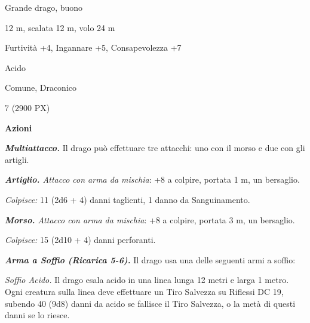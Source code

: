 \begin{multicols}{2}
{%

\begin{description}[noitemsep, topsep=0pt, parsep=0pt, partopsep=0pt, itemsep=1pt, leftmargin=2.35cm,  labelwidth=2.2cm, itemindent=0cm, listparindent=0pt] %
\setlength{\baselineskip}{10pt}
\item[\textbf{Taglia/Tipo}] Grande drago, buono
\item[\textbf{Caratt.}] 
\item[\textbf{Punti Ferita}] 
\item[\textbf{Movimento}] 12 m, scalata 12 m, volo 24 m
\item[\textbf{Tiri Salvez.}] 
\item[\textbf{Comp.}] Furtività +4, Ingannare +5, Consapevolezza +7
\item[\textbf{Imm. Danni}] Acido
\item[\textbf{Sensi}] 
\item[\textbf{Linguaggi}] Comune, Draconico
\item[\textbf{Sfida}] 7 (2900 PX)
\end{description}
\smallskip

\textbf{Azioni}

\emph{\textbf{Multiattacco.}} Il drago può effettuare tre attacchi: uno con il morso e due con gli artigli.

\emph{\textbf{Artiglio.} Attacco con arma da mischia}: +8 a colpire, portata 1 m, un bersaglio.

\emph{Colpisce:} 11 (2d6 + 4) danni taglienti, 1 danno da Sanguinamento.

\emph{\textbf{Morso.} Attacco con arma da mischia}: +8 a colpire, portata 3 m, un bersaglio.

\emph{Colpisce:} 15 (2d10 + 4) danni perforanti.

\emph{\textbf{Arma a Soffio (Ricarica 5-6).}} Il drago usa una delle seguenti armi a soffio:

\emph{Soffio Acido.} Il drago esala acido in una linea lunga 12 metri e larga 1 metro. Ogni creatura sulla linea deve effettuare un Tiro Salvezza su Riflessi DC 19, subendo 40 (9d8) danni da acido se fallisce il Tiro Salvezza, o la metà di questi danni se lo riesce.

}
\end{multicols}

